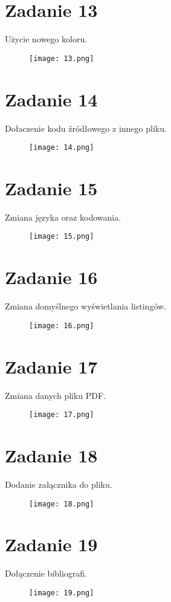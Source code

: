 \documentclass[fleqn,onecolumn,a4paper,12pt,titlepage]{article}
\begin{document}
\section*{Zadanie 13}
Użycie nowego koloru.
\begin{figure}[H]%
    \centering\texttt{[image: 13.png]}
\end{figure}

\section*{Zadanie 14}
Dołaczenie kodu źródłowego z innego pliku.
\begin{figure}[H]%
    \centering\texttt{[image: 14.png]}
\end{figure}

\section*{Zadanie 15}
Zmiana języka oraz kodowania.
\begin{figure}[H]%
    \centering\texttt{[image: 15.png]}
\end{figure}

\section*{Zadanie 16}
Zmiana domyślnego wyświetlania listingów.
\begin{figure}[H]%
    \centering\texttt{[image: 16.png]}
\end{figure}

\section*{Zadanie 17}
Zmiana danych pliku PDF.
\begin{figure}[H]%
    \centering\texttt{[image: 17.png]}
\end{figure}

\section*{Zadanie 18}
Dodanie załącznika do pliku.
\begin{figure}[H]%
    \centering\texttt{[image: 18.png]}
\end{figure}

\section*{Zadanie 19}
Dołączenie bibliografi.
\begin{figure}[H]%
    \centering\texttt{[image: 19.png]}
\end{figure}
\end{document}
